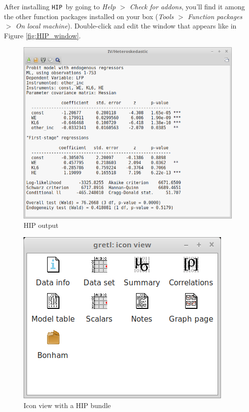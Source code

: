 \documentclass[a4paper,10pt]{article}
\newcommand{\HIP}{\texttt{HIP}}
\begin{document}
After installing \HIP\, by going to \emph{Help $>$ Check for addons},
you'll find it among the other function packages installed on your box
(\emph{Tools $>$ Function packages $>$ On local
  machine}). Double-click and edit the window that appears like in
Figure \ref{fig:HIP_window}.

\begin{figure}[htbp]
  \centering
  \includegraphics[scale=0.4]{HIP-sshot2.png}
  \caption{HIP output}
  \label{fig:HIP_output}
\end{figure}

\begin{figure}[hbtp]
  \centering
  \includegraphics[scale=0.4]{HIP-sshot3.png}
  \caption{Icon view with a HIP bundle}
  \label{fig:iconview}
\end{figure}
\end{document}

